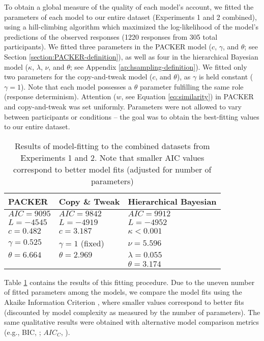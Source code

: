 \documentclass[12pt]{article}
\begin{document}
\begin{flushleft}
To obtain a global measure of the quality of each model's account, we fitted the parameters of each model to our entire dataset (Experiments 1 and 2 combined), using a hill-climbing algorithm which maximized the log-likelihood of the model's predictions of the observed responses (1220 responses from 305 total participants). We fitted three parameters in the PACKER model ($c$, $\gamma$, and $\theta$; see Section \ref{section:PACKER-definition}), as well as four in the hierarchical Bayesian model ($\kappa$, $\lambda$, $\nu$, and $\theta$; see Appendix \ref{ap:hsampling-definition}). We fitted only two parameters for the copy-and-tweak model ($c$, and $\theta$), as $\gamma$ is held constant ($\gamma = 1$). Note that each model possesses a $\theta$ parameter fulfilling the same role (response determinism). Attention ($w$, see Equation \ref{eq:similarity}) in PACKER and copy-and-tweak was set uniformly. Parameters were not allowed to vary between participants or conditions -- the goal was to obtain the best-fitting values to our entire dataset.

\begin{table}
\centering
\caption{Results of model-fitting to the combined datasets from Experiments 1 and 2. Note that smaller AIC values correspond to better model fits (adjusted for number of parameters)}
\label{table:global-model-fits}
\begin{tabular}{ l l l}
\\
 \textbf{PACKER}    & \textbf{Copy \& Tweak} & \textbf{Hierarchical Bayesian} \\ 
 \hline
 $AIC = 9095$       & $AIC = 9842$          & $AIC = 9912$     \\ 
 $L = -4545$        & $L = -4919$           & $L = -4952$       \\ 
 $c = 0.482$        & $c = 3.187$           & $\kappa < 0.001$  \\
 $\gamma = 0.525$   & $\gamma = 1$ (fixed)  & $\nu = 5.596$     \\ 
 $\theta = 6.664$   & $\theta = 2.969$      & $\lambda = 0.055$    \\ 
                    &                       & $\theta = 3.174$  \\ 
\end{tabular}
\end{table}


Table \ref{table:global-model-fits} contains the results of this fitting procedure. Due to the uneven number of fitted parameters among the models, we compare the model fits using the Akaike Information Criterion \citep[AIC;][]{akaike1974new}, where smaller values correspond to better fits (discounted by model complexity as measured by the number of parameters). The same qualitative results were obtained with alternative model comparison metrics (e.g., BIC, \citealp{schwarz1978estimating}; $AIC_C$, \citealp{hurvich1989regression}).


\end{flushleft}
\end{document}
